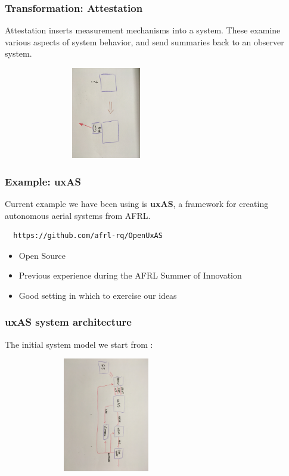 \documentclass{beamer}
\begin{document}
\begin{frame}\frametitle{Transformation: Attestation}

Attestation inserts measurement mechanisms into a system. These
examine various aspects of system behavior, and send summaries back to
an observer system.

\hspace*{10mm}\includegraphics[width=90mm,height=40mm]{att.jpg}

\end{frame}

\begin{frame}[fragile]\frametitle{Example: uxAS}

 Current example we have been using is \textbf{uxAS}, a framework for
creating autonomous aerial systems from AFRL.

\begin{verbatim}
  https://github.com/afrl-rq/OpenUxAS
\end{verbatim}

\begin{itemize}
\item Open Source
\item Previous experience during the AFRL Summer of Innovation
\item Good setting in which to exercise our ideas
\end{itemize}

\end{frame}

\begin{frame}\frametitle{uxAS system architecture}

The initial system model we start from :

  \includegraphics[width=90mm,height=50mm]{uxas-orig.jpg}


\end{frame}
\end{document}

